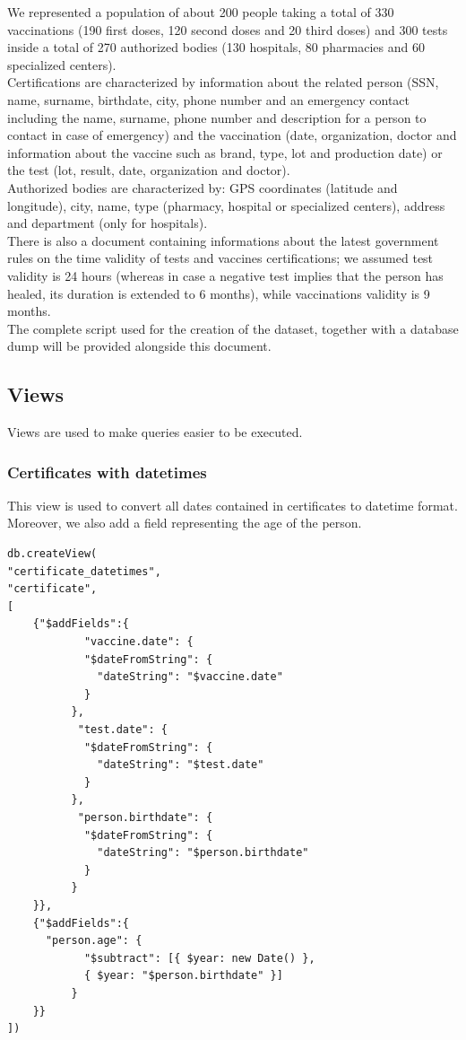 \documentclass[12pt, a4paper]{article}
\begin{document}
We represented a population of about 200 people taking a total of 330 vaccinations
(190 first doses, 120 second doses and 20 third doses) and 300 tests inside
a total of 270 authorized bodies (130 hospitals, 80 pharmacies and 60 
specialized centers). \\
Certifications are characterized by information about the related person
(SSN, name, surname, birthdate, city, phone number and an emergency contact
including the name, surname, phone number and description for a person to 
contact in case of emergency) and the vaccination (date, organization, doctor 
and information about the vaccine such as brand, type, lot and production 
date) or the test (lot, result, date, organization and doctor). \\
Authorized bodies are characterized by: GPS coordinates (latitude and longitude), city,
name, type (pharmacy, hospital or specialized centers), address and department 
(only for hospitals). \\
There is also a document containing informations about the latest government rules
on the time validity of tests and vaccines certifications; we assumed test validity is 
24 hours (whereas in case a negative test implies that the person has healed, its 
duration is extended to 6 months), while vaccinations validity is 9 months. \\
The complete script used for the creation of the dataset, together with a 
database dump will be provided alongside this document.

\subsection{Views}
Views are used to make queries easier to be executed.

\subsubsection{Certificates with datetimes}
This view is used to convert all dates contained in certificates to datetime format. 
Moreover, we also add a field representing the age of the person.

\begin{tcolorbox}[fontupper=\scriptsize]
    \begin{verbatim}
db.createView(
"certificate_datetimes", 
"certificate", 
[
	{"$addFields":{
	        "vaccine.date": {
	        "$dateFromString": {
	          "dateString": "$vaccine.date"
	        }
	      },	       
	       "test.date": {
	        "$dateFromString": {
	          "dateString": "$test.date"
	        }
	      },      
	       "person.birthdate": {
	        "$dateFromString": {
	          "dateString": "$person.birthdate"
	        }
	      }
	}},
	{"$addFields":{
	  "person.age": {
	        "$subtract": [{ $year: new Date() },
	        { $year: "$person.birthdate" }]
	      }
	}}
])
    \end{verbatim}
\end{tcolorbox}
\end{document}

